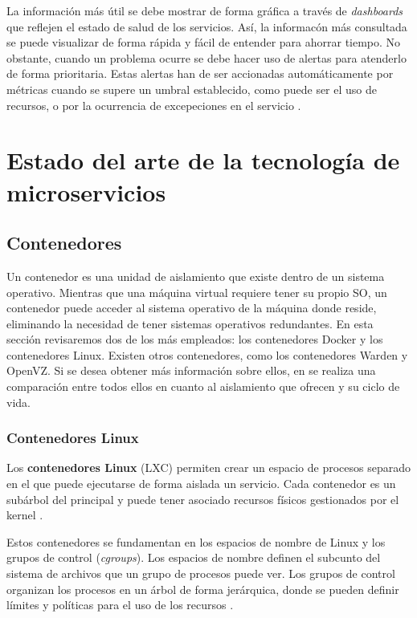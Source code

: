 \documentclass[11pt,spanish,listoffigures]{tfgetsinf}
\begin{document}
La información más útil se debe mostrar de forma gráfica a través de \textit{dashboards} que reflejen el estado de salud de los servicios. Así, la informacón más consultada se puede visualizar de forma rápida y fácil de entender para ahorrar tiempo. No obstante, cuando un problema ocurre se debe hacer uso de alertas para atenderlo de forma prioritaria. Estas alertas han de ser accionadas automáticamente por métricas cuando se supere un umbral establecido, como puede ser el uso de recursos, o por la ocurrencia de excepeciones en el servicio \cite{FowlerSusan}. 

%

\chapter{Estado del arte de la tecnología de microservicios}

\section{Contenedores}

Un contenedor \cite{Hunter2017} es una unidad de aislamiento que existe dentro de un sistema operativo. Mientras que una máquina virtual requiere tener su propio SO, un contenedor puede acceder al sistema operativo de la máquina donde reside, eliminando la necesidad de tener sistemas operativos redundantes. En esta sección revisaremos dos de los más empleados: los contenedores Docker y los contenedores Linux. Existen otros contenedores, como los contenedores Warden y OpenVZ. Si se desea obtener más información sobre ellos, en \cite{Dua2014} se realiza una comparación entre todos ellos en cuanto al aislamiento que ofrecen y su ciclo de vida.

\subsection{Contenedores Linux}

Los \textbf{contenedores Linux} (LXC) \cite{Amaral2016} permiten crear un espacio de procesos separado en el que puede ejecutarse de forma aislada un servicio. Cada contenedor es un subárbol del principal y puede tener asociado recursos físicos gestionados por el kernel \cite{Newman2015a}.

Estos contenedores se fundamentan en los espacios de nombre de Linux y los grupos de control (\textit{cgroups}). Los espacios de nombre definen el subcunto del sistema de archivos que un grupo de procesos puede ver. Los grupos de control organizan los procesos en un árbol de forma jerárquica, donde se pueden definir límites y políticas para el uso de los recursos \cite{Amaral2016}.
\end{document}
